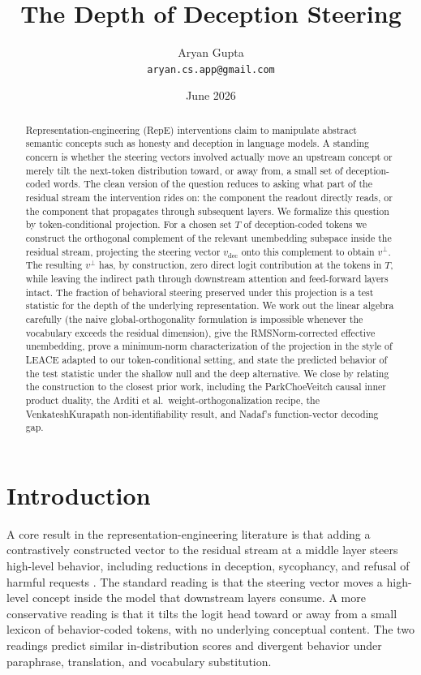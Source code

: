 \documentclass[11pt,letterpaper]{article}
\title{\Large \textbf{The Depth of Deception Steering}}
\author{Aryan Gupta\\\small\texttt{aryan.cs.app@gmail.com}}
\date{June 2026}
\theoremstyle{plain}
\theoremstyle{definition}
\newcommand{\1}{\mathbf{1}}
\newcommand{\vdec}{v_{\text{dec}}}
\newcommand{\vperp}{v^{\perp}}
\begin{document}
\maketitle

\begin{abstract}
\noindent
Representation-engineering (RepE) interventions claim to manipulate abstract semantic concepts such as honesty and deception in language models. A standing concern is whether the steering vectors involved actually move an upstream concept or merely tilt the next-token distribution toward, or away from, a small set of deception-coded words. The clean version of the question reduces to asking what part of the residual stream the intervention rides on: the component the readout directly reads, or the component that propagates through subsequent layers. We formalize this question by token-conditional projection. For a chosen set $T$ of deception-coded tokens we construct the orthogonal complement of the relevant unembedding subspace inside the residual stream, projecting the steering vector $\vdec$ onto this complement to obtain $\vperp$. The resulting $\vperp$ has, by construction, zero direct logit contribution at the tokens in $T$, while leaving the indirect path through downstream attention and feed-forward layers intact. The fraction of behavioral steering preserved under this projection is a test statistic for the depth of the underlying representation. We work out the linear algebra carefully (the naive global-orthogonality formulation is impossible whenever the vocabulary exceeds the residual dimension), give the RMSNorm-corrected effective unembedding, prove a minimum-norm characterization of the projection in the style of LEACE adapted to our token-conditional setting, and state the predicted behavior of the test statistic under the shallow null and the deep alternative. We close by relating the construction to the closest prior work, including the Park\textendash Choe\textendash Veitch causal inner product duality, the Arditi et al.\ weight-orthogonalization recipe, the Venkatesh\textendash Kurapath non-identifiability result, and Nadaf's function-vector decoding gap.
\end{abstract}

\section{Introduction}\label{sec:intro}

A core result in the representation-engineering literature is that adding a contrastively constructed vector to the residual stream at a middle layer steers high-level behavior, including reductions in deception, sycophancy, and refusal of harmful requests \cite{zou2023repe,rimsky2024caa,li2023iti,arditi2024refusal}. The standard reading is that the steering vector moves a high-level concept inside the model that downstream layers consume. A more conservative reading is that it tilts the logit head toward or away from a small lexicon of behavior-coded tokens, with no underlying conceptual content. The two readings predict similar in-distribution scores and divergent behavior under paraphrase, translation, and vocabulary substitution.
\end{document}
